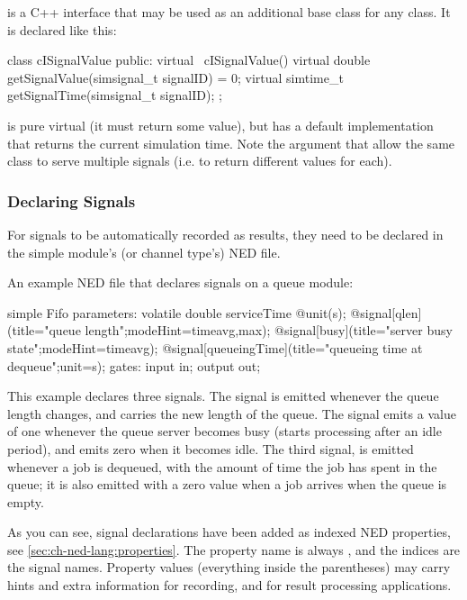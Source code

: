  is a C++ interface that may be used as an additional
base class for any class. It is declared like this:

\begin{cpp}
class cISignalValue {
    public:
        virtual ~cISignalValue() {}
        virtual double getSignalValue(simsignal_t signalID) = 0;
        virtual simtime_t getSignalTime(simsignal_t signalID);
};
\end{cpp}

 is pure virtual (it must return some value),
but  has a default implementation that
returns the current simulation time. Note the  argument
that allow the same class to serve multiple signals (i.e. to return
different values for each).


\subsubsection{Declaring Signals}
\label{sec:ch-simple-modules:statistic-signal-decl}

For signals to be automatically recorded as results, they need to be
declared in the simple module's (or channel type's) NED file.

An example NED file that declares signals on a queue module:

\begin{ned}
simple Fifo
{
    parameters:
        volatile double serviceTime @unit(s);
        @signal[qlen](title="queue length";modeHint=timeavg,max);
        @signal[busy](title="server busy state";modeHint=timeavg);
        @signal[queueingTime](title="queueing time at dequeue";unit=s);
    gates:
        input in;
        output out;
}
\end{ned}

This example declares three signals. The  signal is emitted
whenever the queue length changes, and carries the new length of the queue.
The  signal emits a value of one whenever the queue server
becomes busy (starts processing after an idle period), and emits zero when
it becomes idle. The third signal,  is emitted whenever a
job is dequeued, with the amount of time the job has spent in the queue; it
is also emitted with a zero value when a job arrives when the queue is
empty.

As you can see, signal declarations have been added as indexed NED
properties, see \ref{sec:ch-ned-lang:properties}. The property name is
always , and the indices are the signal names. Property values
(everything inside the parentheses) may carry hints and extra information
for recording, and for result processing applications.

